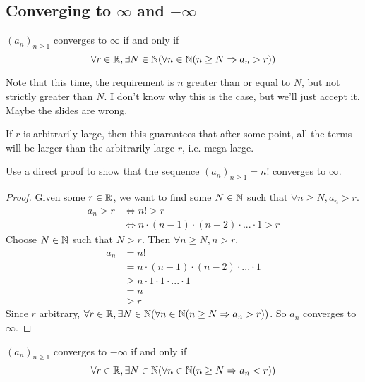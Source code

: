 
\subsection{Converging to $\infty$ and $-\infty$}
\begin{definition}
  $(a_n)_{n \geq 1}$ converges to $\infty$ if and only if
  \[
    \forall r \in \mathbb{R}, \exists N \in \mathbb{N} (\forall n \in \mathbb{N} (n \geq N \Rightarrow a_n > r))
  \]
\end{definition}
Note that this time, the requirement is $n$ greater than or equal to $N$, but not strictly greater than $N$. I don't know why this is the case, but we'll just accept it. Maybe the slides are wrong.
\begin{intuition}
  If $r$ is arbitrarily large, then this guarantees that after some point, all the terms will be larger than the arbitrarily large $r$, i.e. mega large.
\end{intuition}
\begin{eg}
  Use a direct proof to show that the sequence $(a_n)_{n \geq 1} = n!$ converges to $\infty$.
\end{eg}
\begin{proof}
  Given some $r \in \mathbb{R}$, we want to find some $N \in \mathbb{N}$ such that $\forall n \geq N, a_n > r$.
  \begin{align*}
    a_n > r &\iff n! > r \\
    &\iff n \cdot (n - 1) \cdot (n - 2) \cdot ... \cdot 1 > r
  \end{align*}
  Choose $N \in \mathbb{N}$ such that $N > r$. Then $\forall n \geq N, n > r$.
  \begin{align*}
    a_n &= n! \\
    &= n \cdot (n - 1) \cdot (n - 2) \cdot ... \cdot 1 \\
    &\geq n \cdot 1 \cdot 1 \cdot ... \cdot 1 \\
    &= n \\
    &> r 
  \end{align*}
  Since $r$ arbitrary, $\forall r \in \mathbb{R}, \exists N \in \mathbb{N} (\forall n \in \mathbb{N} (n \geq N \Rightarrow a_n > r))$. So $a_n$ converges to $\infty$.
\end{proof}
\begin{definition}
  $(a_n)_{n \geq 1}$ converges to $-\infty$ if and only if
  \[
    \forall r \in \mathbb{R}, \exists N \in \mathbb{N} (\forall n \in \mathbb{N} (n \geq N \Rightarrow a_n < r))
  \]
\end{definition}
